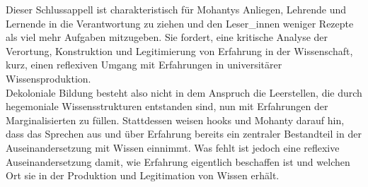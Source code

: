 \noindent Dieser Schlussappell ist charakteristisch für Mohantys Anliegen, Lehrende und
Lernende in die Verantwortung zu ziehen und den Leser\_innen weniger Rezepte
als viel mehr Aufgaben mitzugeben. Sie fordert, eine kritische Analyse der
Verortung, Konstruktion und Legitimierung von Erfahrung in der Wissenschaft,
kurz, einen reflexiven Umgang mit Erfahrungen in universitärer
Wissensproduktion.\\
Dekoloniale Bildung besteht also nicht in dem Anspruch die Leerstellen, die
durch hegemoniale Wissensstrukturen entstanden sind, nun mit Erfahrungen der
Marginalisierten zu füllen. Stattdessen weisen hooks und Mohanty darauf hin,
dass das Sprechen aus und über Erfahrung bereits ein zentraler Bestandteil in
der Auseinandersetzung mit Wissen einnimmt. Was fehlt ist jedoch eine reflexive
Auseinandersetzung damit, wie Erfahrung eigentlich beschaffen ist und welchen
Ort sie in der Produktion und Legitimation von Wissen erhält. \\

